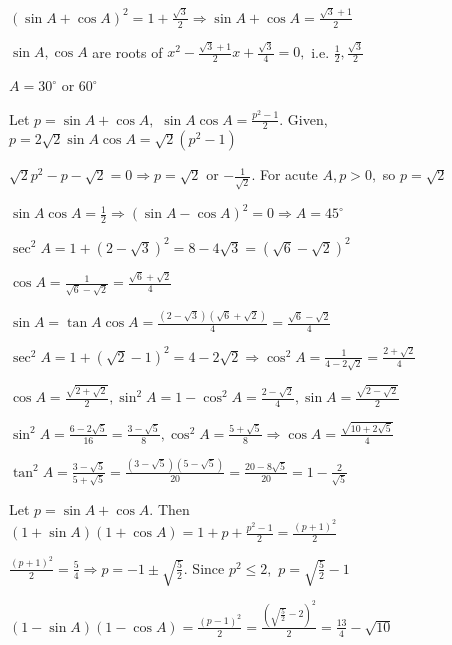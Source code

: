     $(\sin A + \cos A)^2 = 1 + \frac{\sqrt{3}}{2} \Rightarrow \sin A + \cos A = \frac{\sqrt{3} + 1}{2}$

    $\sin A, \cos A$ are roots of $x^2 - \frac{\sqrt{3} + 1}{2}x + \frac{\sqrt{3}}{4} = 0,$ i.e. $\frac{1}{2},
    \frac{\sqrt{3}}{2}$

    $A = 30^\circ$ or $60^\circ$

\item Let $p = \sin A + \cos A,$ $\sin A\cos A = \frac{p^2 - 1}{2}$. Given, $p = 2\sqrt{2}\sin A\cos A = \sqrt{2}(p^2 - 1)$

    $\sqrt{2}p^2 - p - \sqrt{2} = 0 \Rightarrow p = \sqrt{2}$ or $-\frac{1}{\sqrt{2}}$. For acute $A, p > 0,$ so $p = \sqrt{2}$

    $\sin A\cos A = \frac{1}{2} \Rightarrow (\sin A - \cos A)^2 = 0 \Rightarrow A = 45^\circ$

\item $\sec^2 A = 1 + (2 - \sqrt{3})^2 = 8 - 4\sqrt{3} = (\sqrt{6} - \sqrt{2})^2$

    $\cos A = \frac{1}{\sqrt{6} - \sqrt{2}} = \frac{\sqrt{6} + \sqrt{2}}{4}$

    $\sin A = \tan A\cos A = \frac{(2 - \sqrt{3})(\sqrt{6} + \sqrt{2})}{4} = \frac{\sqrt{6} - \sqrt{2}}{4}$

\item $\sec^2 A = 1 + (\sqrt{2} - 1)^2 = 4 - 2\sqrt{2} \Rightarrow \cos^2 A = \frac{1}{4 - 2\sqrt{2}} = \frac{2 + \sqrt{2}}{4}$

    $\cos A = \frac{\sqrt{2 + \sqrt{2}}}{2}, \sin^2 A = 1 - \cos^2 A = \frac{2 - \sqrt{2}}{4}, \sin A = \frac{\sqrt{2 -
    \sqrt{2}}}{2}$

\item $\sin^2 A = \frac{6 - 2\sqrt{5}}{16} = \frac{3 - \sqrt{5}}{8}, \cos^2 A = \frac{5 + \sqrt{5}}{8} \Rightarrow \cos A =
    \frac{\sqrt{10 + 2\sqrt{5}}}{4}$

    $\tan^2 A = \frac{3 - \sqrt{5}}{5 + \sqrt{5}} = \frac{(3 - \sqrt{5})(5 - \sqrt{5})}{20} = \frac{20 - 8\sqrt{5}}{20} = 1 -
    \frac{2}{\sqrt{5}}$

\item Let $p = \sin A + \cos A$. Then $(1 + \sin A)(1 + \cos A) = 1 + p + \frac{p^2 - 1}{2} = \frac{(p + 1)^2}{2}$

    $\frac{(p + 1)^2}{2} = \frac{5}{4} \Rightarrow p = -1 \pm \sqrt{\frac{5}{2}}$. Since $p^2 \leq 2,$ $p = \sqrt{\frac{5}{2}} - 1$

    $(1 - \sin A)(1 - \cos A) = \frac{(p - 1)^2}{2} = \frac{\left(\sqrt{\frac{5}{2}} - 2\right)^2}{2} = \frac{13}{4} - \sqrt{10}$

